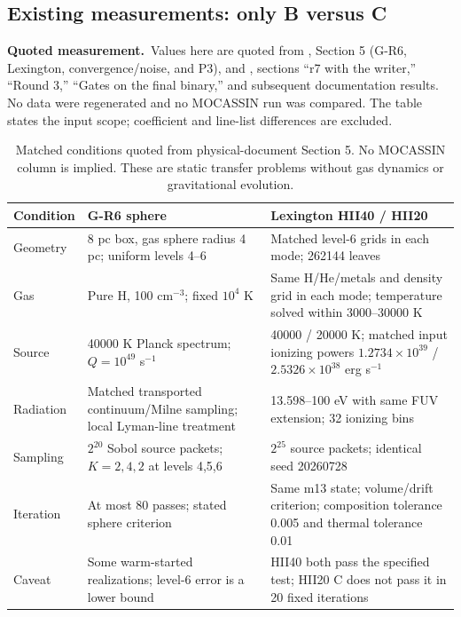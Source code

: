 \documentclass[english,a4paper]{my_memo}
\newcommand{\Measured}{\noindent\textbf{Quoted measurement.}\ }
\begin{document}
\FloatBarrier
\subsection{Existing measurements: only B versus C}
\label{sec:measurements}
\Measured Values here are quoted from ,
Section 5 (G-R6, Lexington, convergence/noise, and P3), and
, sections
``r7 with the writer,'' ``Round 3,'' ``Gates on the final binary,'' and
subsequent documentation results.
No data were regenerated and no MOCASSIN run was compared. The table
states the input scope; coefficient and line-list differences are excluded.

\begin{table}[htbp]\centering\small\setlength{\tabcolsep}{4pt}
\begin{tabular}{@{}P{.18\linewidth}P{.38\linewidth}P{.38\linewidth}@{}}
\toprule Condition & G-R6 sphere & Lexington HII40 / HII20\\\midrule
Geometry & 8 pc box, gas sphere radius 4 pc; uniform levels 4--6 & Matched level-6 grids in each mode; 262144 leaves\\
Gas & Pure H, 100 cm$^{-3}$; fixed $10^4$ K & Same H/He/metals and density grid in each mode; temperature solved within 3000--30000 K\\
Source & 40000 K Planck spectrum; $Q=10^{49}$ s$^{-1}$ & 40000 / 20000 K; matched input ionizing powers $1.2734\times10^{39}$ / $2.5326\times10^{38}$ erg s$^{-1}$\\
Radiation & Matched transported continuum/Milne sampling; local Lyman-line treatment & 13.598--100 eV with same FUV extension; 32 ionizing bins\\
Sampling & $2^{20}$ Sobol source packets; $K=2,4,2$ at levels 4,5,6 & $2^{25}$ source packets; identical seed 20260728\\
Iteration & At most 80 passes; stated sphere criterion & Same m13 state; volume/drift criterion; composition tolerance 0.005 and thermal tolerance 0.01\\
Caveat & Some warm-started realizations; level-6 error is a lower bound & HII40 both pass the specified test; HII20 C does not pass it in 20 fixed iterations\\\bottomrule
\end{tabular}
\caption{Matched conditions quoted from physical-document Section 5.
No MOCASSIN column is implied. These are static transfer problems
without gas dynamics or gravitational evolution.}
\end{table}
\end{document}
